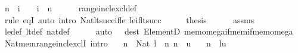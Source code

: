 \begin{isabellebody}
\ {\isachardoublequoteopen}{\isacharbrackleft}{\kern0pt}{}{\isacharcomma}{\kern0pt}{\isasymdots}{\isacharcomma}{\kern0pt}n{\isacharbrackright}{\kern0pt}\ {\isacharequal}{\kern0pt}\ {\isacharbraceleft}{\kern0pt}i\ {\isasymin}\ {\isasymnat}\ {\isacharbar}{\kern0pt}\ i\ {\isasymle}\ n{\isacharbraceright}{\kern0pt}{\isachardoublequoteclose}\isanewline
\ \ \ \ \isamarkupfalse%
\ range{\isacharunderscore}{\kern0pt}incl{\isacharunderscore}{\kern0pt}excl{\isacharunderscore}{\kern0pt}def\isanewline
\ \ \ \ \isamarkupfalse%
\ {\isacharparenleft}{\kern0pt}rule\ eqI{\isacharparenright}{\kern0pt}\ {\isacharparenleft}{\kern0pt}auto\ intro{\isacharcolon}{\kern0pt}\ Nat{\isacharunderscore}{\kern0pt}lt{\isacharunderscore}{\kern0pt}succ{\isacharunderscore}{\kern0pt}if{\isacharunderscore}{\kern0pt}le\ le{\isacharunderscore}{\kern0pt}if{\isacharunderscore}{\kern0pt}lt{\isacharunderscore}{\kern0pt}succ{\isacharparenright}{\kern0pt}\isanewline
\ \ \isamarkupfalse%
\ \isamarkupfalse%
\ {\isacharquery}{\kern0pt}thesis\isanewline
\ \ \ \ \isamarkupfalse%
\ assms\ \isamarkupfalse%
\ le{\isacharunderscore}{\kern0pt}def\ lt{\isacharunderscore}{\kern0pt}def\ nat{\isacharunderscore}{\kern0pt}def\isanewline
\ \ \ \ \isamarkupfalse%
\ {\isacharparenleft}{\kern0pt}auto\ {}\ {}\ dest{\isacharcolon}{\kern0pt}\ ElementD\ mem{\isacharunderscore}{\kern0pt}omega{\isacharunderscore}{\kern0pt}if{\isacharunderscore}{\kern0pt}mem{\isacharunderscore}{\kern0pt}if{\isacharunderscore}{\kern0pt}mem{\isacharunderscore}{\kern0pt}omega{\isacharparenright}{\kern0pt}\isanewline
{}\isamarkupfalse%
%
\endisatagproof
{\isafoldproof}%
%
\isadelimproof
\isanewline
%
\endisadelimproof
\isanewline
\isanewline
{}\isamarkupfalse%
\ Nat{\isacharunderscore}{\kern0pt}mem{\isacharunderscore}{\kern0pt}range{\isacharunderscore}{\kern0pt}incl{\isacharunderscore}{\kern0pt}exclI\ {\isacharbrackleft}{\kern0pt}intro{\isacharbrackright}{\kern0pt}{\isacharcolon}{\kern0pt}\isanewline
\ \ \ {\isachardoublequoteopen}n\ {\isacharcolon}{\kern0pt}\ Nat{\isachardoublequoteclose}\ {\isachardoublequoteopen}l\ {\isasymle}\ n{\isachardoublequoteclose}\ {\isachardoublequoteopen}n\ {\isacharless}{\kern0pt}\ u{\isachardoublequoteclose}\isanewline
\ \ \ {\isachardoublequoteopen}n\ {\isasymin}\ {\isacharbrackleft}{\kern0pt}l{\isacharcomma}{\kern0pt}{\isasymdots}{\isacharcomma}{\kern0pt}u{\isacharbrackleft}{\kern0pt}{\isachardoublequoteclose}\isanewline

\end{isabellebody}
